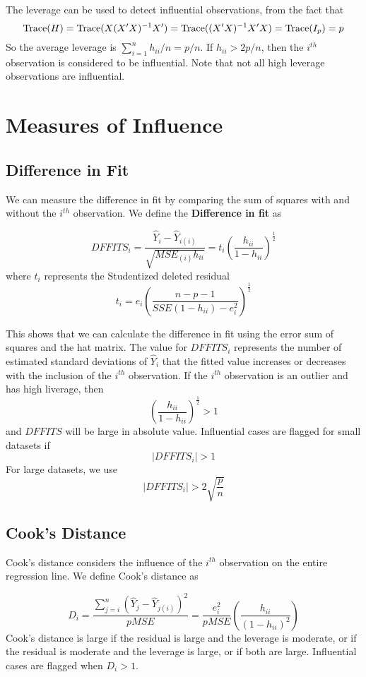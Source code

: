 The leverage can be used to detect influential observations, from the fact that 
    \[\operatorname{Trace}(H) = \operatorname{Trace}(X(X'X)^{-1}X') = \operatorname{Trace}((X'X)^{-1}X'X) = \operatorname{Trace}(I_p) = p\]
    So the average leverage is $\sum_{i=1}^n h_{ii}/n = p/n$. If $h_{ii} > 2p/n$, then the $i^{th}$ observation is considered to be influential. Note that not all high leverage observations are influential.


\section{Measures of Influence}

\subsection{Difference in Fit}

We can measure the difference in fit by comparing the sum of squares with and without the $i^{th}$ observation. We define the \textbf{Difference in fit} as

\[DFFITS_i = \frac{\hat{Y}_i - \hat{Y}_{i(i)}}{\sqrt{MSE_{(i)}h_{ii}}} = t_i \left(\frac{h_{ii}}{1-h_{ii}}\right)^{\frac{1}{2}}\]
where $t_i$ represents the Studentized deleted residual 
\[t_i = e_i\left(\frac{n-p-1}{SSE(1-h_{ii})-e_i^2}\right)^{\frac{1}{2}}\]

This shows that we can calculate the difference in fit using the error sum of squares and the hat matrix. The value for $DFFITS_i$  represents the number of estimated standard deviations of $\hat{Y}_i$ that the fitted value increases or decreases with the inclusion of the $i^{th}$ observation. If the $i^{th}$ observation is an outlier and has high liverage, then 
\[\left(\frac{h_{ii}}{1-h_{ii}}\right)^{\frac{1}{2}} > 1\]
and $DFFITS$ will be large in absolute value. Influential cases are flagged for small datasets if 
\[|DFFITS_i| > 1\]
For large datasets, we use 
\[|DFFITS_i| > 2\sqrt{\frac{p}{n}}\]

\subsection{Cook's Distance}

Cook's distance considers the influence of the $i^{th}$ observation on the entire regression line. We define Cook's distance as

\[D_i = \frac{\sum_{j=i}^n(\hat{Y}_j - \hat{Y}_{j(i)})^2}{pMSE} = \frac{e_i^2}{pMSE}\left(\frac{h_{ii}}{(1-h_{ii})^2}\right)\]
Cook's distance is large if the residual is large and the leverage is moderate, or if the residual is moderate and the leverage is large, or if both are large. Influential cases are flagged when $D_i > 1$. 

